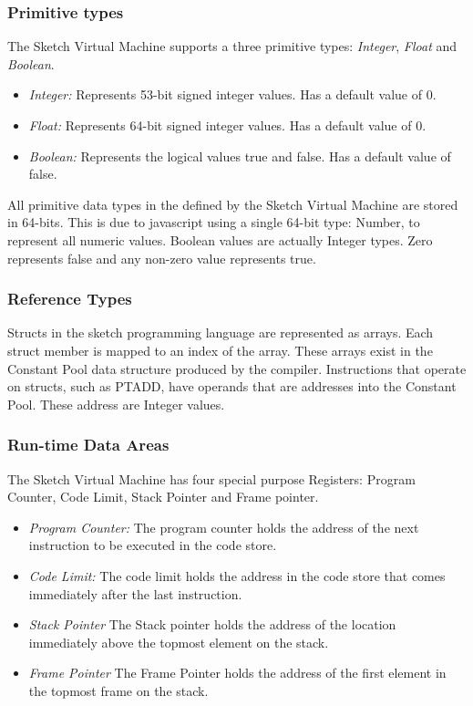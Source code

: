 \documentclass{l3proj}
\begin{document}
\subsubsection{Primitive types}
The Sketch Virtual Machine supports a three primitive types: \textit{Integer}, \textit{Float} and \textit{Boolean}.
\begin{itemize}
	\item \textit{Integer:} Represents 53-bit signed integer values. Has a default value of 0. 
	\item \textit{Float:} Represents 64-bit signed integer values. Has a default value of 0.
	\item \textit{Boolean:} Represents the logical values true and false. Has a default value of false.
\end{itemize}
All primitive data types in the defined by the Sketch Virtual Machine are stored in 64-bits. This is due to javascript using a single 64-bit type: Number, to represent all numeric values. Boolean values are actually Integer types. Zero represents false and any non-zero value represents true.

\subsubsection{Reference Types}
Structs in the sketch programming language are represented as arrays. Each struct member is mapped to an index of the array. These arrays exist in the Constant Pool data structure produced by the compiler. Instructions that operate on structs, such as PTADD, have operands that are addresses into the Constant Pool. These address are Integer values.

\subsubsection{Run-time Data Areas}
The Sketch Virtual Machine has four special purpose Registers: Program Counter, Code Limit, Stack Pointer and Frame pointer.
\begin{itemize}
	\item\textit{Program Counter:} The program counter holds the address of the next instruction to be executed in the code store.
	\item\textit{Code Limit:} The code limit holds the address in the code store that comes immediately after the last instruction.
	\item\textit{Stack Pointer} The Stack pointer holds the address of the location immediately above the topmost element on the stack.
	\item\textit{Frame Pointer} The Frame Pointer holds the address of the first element in the topmost frame on the stack.
\end{itemize}
\end{document}
